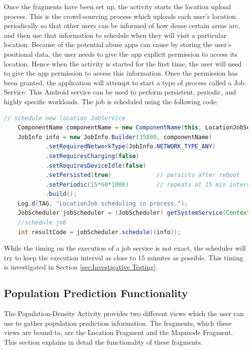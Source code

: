 Once the fragments have been set up, the activity starts the location upload process. This is the crowd-sourcing process which uploads each user's location periodically so that other users can be informed of how dense certain areas are, and then use that information to schedule when they will visit a particular location. Because of the potential abuse apps can cause by storing the user's positional data, the user needs to give the app explicit permission to access its location. Hence when the activity is started for the first time, the user will need to give the app permission to access this information. Once the permission has been granted, the application will attempt to start a type of process called a Job Service. This Android service can be used to perform persistent, periodic, and highly specific workloads. The job is scheduled using the following code:

\begin{lstlisting}[caption={PopDensityActivity scheduling the LocationJobService.},label={lst:schedule_job},language=Java]
    // schedule new location JobService
    ComponentName componentName = new ComponentName(this, LocationJobService.class);
    JobInfo info = new JobInfo.Builder(35800, componentName)
            .setRequiredNetworkType(JobInfo.NETWORK_TYPE_ANY)
            .setRequiresCharging(false)
            .setRequiresDeviceIdle(false)
            .setPersisted(true)             // persists after reboot
            .setPeriodic(15*60*1000)        // repeats at 15 min intervals
            .build();
    Log.d(TAG, "LocationJob scheduling in process.");
    JobScheduler jobScheduler = (JobScheduler) getSystemService(Context.JOB_SCHEDULER_SERVICE);
    //schedule job
    int resultCode = jobScheduler.schedule((info));
\end{lstlisting}

While the timing on the execution of a job service is not exact, the scheduler will try to keep the execution interval as close to 15 minutes as possible. This timing is investigated in Section \ref{sec:Investigative Testing}.

\subsection{Population Prediction Functionality} 
The Population-Density Activity provides two different views which the user can use to gather population prediction information. The fragments, which these views are bound to, are the Location Fragment and the Mapmode Fragment. This section explains in detail the functionality of these fragments.

